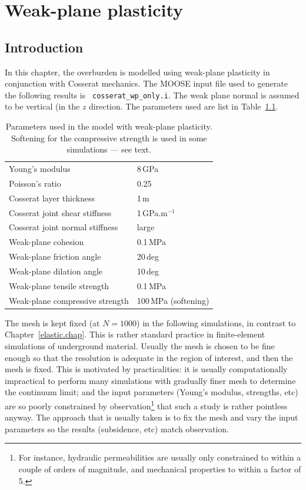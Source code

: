 \documentclass[]{scrreprt}
\begin{document}
\chapter{Weak-plane plasticity}
\label{wp.chap}

\section{Introduction}
In this chapter, the overburden is modelled using weak-plane
plasticity in conjunction with Cosserat mechanics.  The MOOSE input
file used to generate the following results is {\tt
  cosserat\_wp\_only.i}.  The weak plane
normal is assumed to be vertical (in the $z$ direction.  The parameters
used are list in Table~\ref{wp.params.tab}.

\begin{table}[htb]
\begin{center}
\begin{tabular}{ll}
Young's modulus & 8\,GPa \\
Poisson's ratio & 0.25 \\
Cosserat layer thickness & 1\,m \\
Cosserat joint shear stiffness & 1\,GPa.m$^{-1}$ \\
Cosserat joint normal stiffness & large \\
Weak-plane cohesion & 0.1\,MPa \\
Weak-plane friction angle & 20\,deg \\
Weak-plane dilation angle & 10\,deg \\
Weak-plane tensile strength & 0.1\,MPa \\
Weak-plane compressive strength & 100\,MPa (softening)
\end{tabular}
\caption{Parameters used in the model with weak-plane plasticity.
  Softening for the compressive strength is used in some simulations
  --- see text.}
\label{wp.params.tab}
\end{center}
\end{table}

The mesh is kept fixed (at $N=1000$) in the following simulations, in
contrast to Chapter~\ref{elastic.chap}.  This is rather standard practice in
finite-element simulations of underground material.  Usually the mesh
is chosen to be fine enough so that the resolution is adequate in the
region of interest, and then the mesh is fixed.  This is
motivated by practicalities: it is usually computationally impractical
to perform many simulations with gradually finer mesh to determine the
continuum limit; and the input parameters (Young's modulus, strengths,
etc) are so poorly constrained by observation\footnote{For instance,
  hydraulic permeabilities are usually only constrained to within a
  couple of orders of magnitude, and mechanical properties to within a
  factor of 5.}  that such a study is rather pointless anyway.  The
approach that is usually taken is to fix the mesh and vary the input
parameters so the results (subsidence, etc) match observation.
\end{document}
